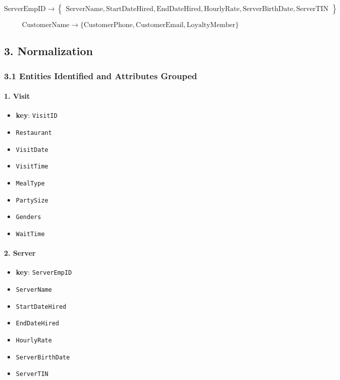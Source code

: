 \documentclass[
]{article}
\providecommand{\tightlist}{%
  \setlength{\itemsep}{0pt}\setlength{\parskip}{0pt}}
\begin{document}
\[
\text{ServerEmpID} \rightarrow 
\left\{
\begin{array}{l}
\text{ServerName}, \text{StartDateHired}, \text{EndDateHired}, \text{HourlyRate}, \text{ServerBirthDate}, \text{ServerTIN}
\end{array}
\right\}
\]

\[
\text{CustomerName} \rightarrow \{\text{CustomerPhone}, \text{CustomerEmail}, \text{LoyaltyMember}\}
\]

\subsection{\texorpdfstring{\textbf{3.
Normalization}}{3. Normalization}}\label{normalization}

\subsubsection{\texorpdfstring{\textbf{3.1 Entities Identified and
Attributes
Grouped}}{3.1 Entities Identified and Attributes Grouped}}\label{entities-identified-and-attributes-grouped}

\paragraph{\texorpdfstring{\textbf{1. Visit}}{1. Visit}}\label{visit}

\begin{itemize}
\tightlist
\item
  \textbf{key}: \texttt{VisitID}
\item
  \texttt{Restaurant}
\item
  \texttt{VisitDate}
\item
  \texttt{VisitTime}
\item
  \texttt{MealType}
\item
  \texttt{PartySize}
\item
  \texttt{Genders}
\item
  \texttt{WaitTime}
\end{itemize}

\paragraph{\texorpdfstring{\textbf{2. Server}}{2. Server}}\label{server}

\begin{itemize}
\tightlist
\item
  \textbf{key}: \texttt{ServerEmpID}
\item
  \texttt{ServerName}
\item
  \texttt{StartDateHired}
\item
  \texttt{EndDateHired}
\item
  \texttt{HourlyRate}
\item
  \texttt{ServerBirthDate}
\item
  \texttt{ServerTIN}
\end{itemize}
\end{document}
